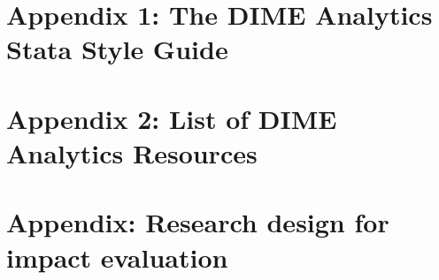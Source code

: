 


\chapter{Appendix 1: The DIME Analytics Stata Style Guide}
\label{ap:1}




\chapter{Appendix 2: List of DIME Analytics Resources}
\label{ap:2}





\chapter{Appendix: Research design for impact evaluation}
\label{ap:1}




\backmatter




\printindex %


